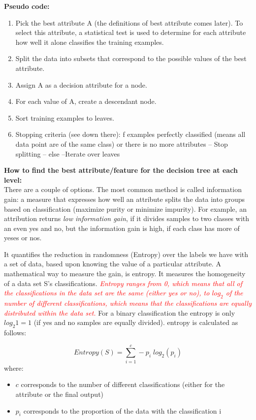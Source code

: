 \documentclass[12pt]{report}
\begin{document}
\hfill \break
\textbf{Pseudo code:}
\begin{enumerate}
\item Pick the best attribute A (the definitions of best attribute comes later). To select this attribute, a statistical test is used to determine for each attribute how well it alone classifies the training examples.
\item Split the data into subsets that correspond to the possible values of the best attribute.
\item Assign A as a decision attribute for a node.
\item For each value of A, create a descendant node.
\item Sort training examples to leaves.
\item Stopping criteria (see down there): f examples perfectly classified (means all data point are of the same class) or there is no more attributes --	Stop splitting -- else --Iterate over leaves
\end{enumerate}

\hfill \break
\textbf{How to find the best attribute/feature for the decision tree at each level:} \\
There are a couple of options. The most common method is called information gain: a measure that expresses how well an attribute splits the data into groups based on classification (maximize purity or minimize impurity). For example, an attribution returns \textit{low information gain}, if it divides samples to two classes with an even yes and no, but the information gain is high, if each class has more of yeses or nos.

It quantifies the reduction in randomness (Entropy) over the labels we have with a set of data, based upon knowing the value of a particular attribute. A mathematical way to measure the gain, is entropy. It measures the homogeneity of a data set S's  classifications. \textcolor{red}{\textit{Entropy ranges from 0, which means that all of the classifications in the data set are the same (either yes or no), to $log_{2}$ of the number of different classifications, which means that the classifications are equally distributed within the data set.}} For a binary classification the entropy is only $log_{2} 1 = 1$ (if yes and no samples are equally divided). entropy is calculated as follows:

\begin{equation}
Entropy(S) = \sum_{i=1}^{c} -p_{i} \; log_{2} (p_{i})
\end{equation}
where:
\begin{itemize}
\item $c$ corresponds to the number of different classifications (either for the attribute or the final output)
\item $p_{i}$ corresponds to the proportion of the data with the classification i
\end{itemize}
\end{document}
